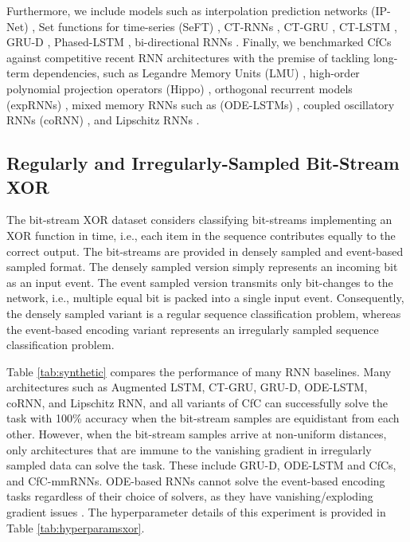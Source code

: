 \documentclass[12pt]{article}
\begin{document}
Furthermore, we include models such as interpolation prediction networks (IP-Net) \cite{shukla2018interpolation}, Set functions for time-series (SeFT) \cite{horn2020set}, CT-RNNs \cite{funahashi1993approximation}, CT-GRU \cite{mozer2017discrete}, CT-LSTM \cite{mei2017neural}, GRU-D \cite{che2018recurrent}, Phased-LSTM \cite{neil2016phased}, bi-directional RNNs \cite{schuster1997bidirectional}. Finally, we benchmarked CfCs against competitive recent RNN architectures with the premise of tackling long-term dependencies, such as Legandre Memory Units (LMU) \cite{voelker2019legendre}, high-order polynomial projection operators (Hippo) \cite{gu2020hippo}, orthogonal recurrent models (expRNNs) \cite{lezcano2019cheap}, mixed memory RNNs such as (ODE-LSTMs) \cite{lechner2020learning}, coupled oscillatory RNNs (coRNN) \cite{rusch2021coupled}, and Lipschitz RNNs \cite{erichson2021lipschitz}. 

\subsection*{Regularly and Irregularly-Sampled Bit-Stream XOR}
The bit-stream XOR dataset \cite{lechner2020learning} considers classifying bit-streams implementing an XOR function in time, i.e., each item in the sequence contributes equally to the correct output. The bit-streams are provided in densely sampled and event-based sampled format. The densely sampled version simply represents an incoming bit as an input event. The event sampled version transmits only bit-changes to the network, i.e., multiple equal bit is packed into a single input event. Consequently, the densely sampled variant is a regular sequence classification problem, whereas the event-based encoding variant represents an irregularly sampled sequence classification problem. 

Table \ref{tab:synthetic} compares the performance of many RNN baselines. Many architectures such as Augmented LSTM, CT-GRU, GRU-D, ODE-LSTM, coRNN, and Lipschitz RNN, and all variants of CfC can successfully solve the task with 100\% accuracy when the bit-stream samples are equidistant from each other. However, when the bit-stream samples arrive at non-uniform distances, only architectures that are immune to the vanishing gradient in irregularly sampled data can solve the task. These include GRU-D, ODE-LSTM and CfCs, and CfC-mmRNNs. ODE-based RNNs cannot solve the event-based encoding tasks regardless of their choice of solvers, as they have vanishing/exploding gradient issues \cite{lechner2020learning}. The hyperparameter details of this experiment is provided in Table \ref{tab:hyperparamsxor}.
\end{document}
